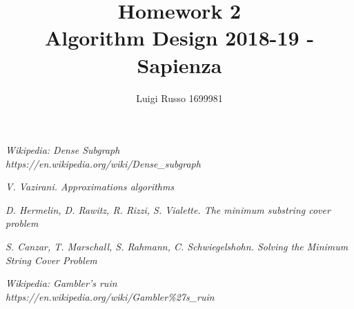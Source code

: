 \documentclass[11pt]{article}
\title{Homework 2\\
	\large Algorithm Design 2018-19 - Sapienza}
\author{Luigi Russo 1699981}
\begin{document}
	
\maketitle
\newpage
\tableofcontents
\newpage

\begin{thebibliography}{10}	
	\textsl{Wikipedia: Dense Subgraph} \\
	\textit{https://en.wikipedia.org/wiki/Dense\_subgraph}	
	
	\textsl{V. Vazirani. Approximations algorithms}

	\textsl{D. Hermelin, D. Rawitz, R. Rizzi, S. Vialette. The minimum substring cover problem}

	\textsl{S. Canzar, T. Marschall, S. Rahmann, C. Schwiegelshohn. Solving the Minimum String Cover Problem}
	
	
	\textsl{Wikipedia: Gambler's ruin} \\
	\textit{https://en.wikipedia.org/wiki/Gambler\%27s\_ruin}
\end{thebibliography}
\end{document}
